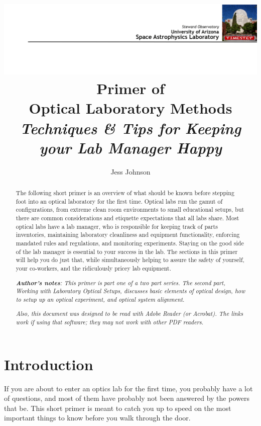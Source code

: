 \documentclass[11pt]{article}
\title{
    {\vspace{-1.5cm}}
    {\hspace{-2cm}}   
    {\includegraphics{TimestepHeader.png}}
    {\large Primer of}\\
    {Optical Laboratory Methods}\\
    {\Large \textit{Techniques \& Tips for Keeping your Lab Manager Happy}}
 }
\author{\large Jess Johnson}
\affil{\small Senior Instrumentation Scientist \\ Steward Observatory, University of Arizona \\ November 23, 2023}
\date{}
\begin{document}
\maketitle


\begin{abstract}

The following short primer is an overview of what should be known before stepping foot into an optical laboratory for the first time. Optical labs run the gamut of configurations, from extreme clean room environments to small educational setups, but there are common considerations and etiquette expectations that all labs share. Most optical labs have a lab manager, who is responsible for keeping track of parts inventories, maintaining laboratory cleanliness and equipment functionality, enforcing mandated rules and regulations, and monitoring experiments. Staying on the good side of the lab manager is essential to your success in the lab. The sections in this primer will help you do just that, while simultaneously helping to assure the safety of yourself, your co-workers, and the ridiculously pricey lab equipment.

\vspace{5mm}

\textit{\textbf{Author's notes}: This primer is part one of a two part series. The second part, \textit{Working with Laboratory Optical Setups}, discusses basic elements of optical design, how to setup up an optical experiment, and optical system alignment.}

\textit{Also, this document was designed to be read with Adobe Reader (or Acrobat). The links work if using that software; they may not work with other PDF readers.}

\end{abstract}

\newpage


\tableofcontents

\newpage


\section{Introduction}
If you are about to enter an optics lab for the first time, you probably have a lot of questions, and most of them have probably  not been answered by the powers that be. This short primer is meant to catch you up to speed on the most important things to know before you walk through the door.
\end{document}
